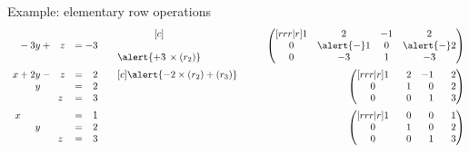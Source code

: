\documentclass%
[handout]%
{beamer}
\begin{document}
\begin{frame}[label=ERO-example]{Example: elementary row operations}
\begin{alignat*}{2}
\begin{matrix}
    \hphantom{2x} -            3y + \hphantom{-}z  & = -3   \end{matrix}
& \qquad
  \begin{matrix}[c]
     \\
     \\
   \alert{+3\,\times (r_2)}
  \end{matrix}
        \qquad & \begin{pmatrix}[rrr|r]
    1 &  2 & -1 &  2 \\
    0 &  \alert{-}1 &  0 & \alert{-}2 \\
    0 & -3 &  1 & -3
  \end{pmatrix}&
      \\[2pt]
  \begin{matrix}
    \hphantom{2}x +            2y - \hphantom{-}z  & = \hphantom{-}2 \\
    \hphantom{2x-2}y  \hphantom{--z}  & = \hphantom{-}2 \\
    \hphantom{2x+2y-} \hphantom{-}z  & = \hphantom{-}3   \end{matrix}
& \qquad
  \begin{matrix}[c]
     \alert{-2\times(r_2) + (r_3)}\\
    \\
    \null
  \end{matrix}
        \qquad &
  \begin{pmatrix}[rrr|r]
    1 & \hphantom{-}2 & -1 & \hphantom{-}2 \\
    0 & \hphantom{-}1 & \hphantom{-}0 & \hphantom{-}2 \\
    0 & \hphantom{-}0 & \hphantom{-}1 & \hphantom{-}3
  \end{pmatrix}&
       \\[2pt]
  \begin{matrix}
    \hphantom{2}x             \hphantom{+2y - -z}  & = \hphantom{-}1 \\
    \hphantom{2x-2}y  \hphantom{--z}  & = \hphantom{-}2 \\
    \hphantom{2x+2y-} \hphantom{-}z  & = \hphantom{-}3   \end{matrix}
& \quad
  \begin{matrix}
     \\
    \\
   \null
  \end{matrix}
        \qquad &
  \begin{pmatrix}[rrr|r]
    1 & \hphantom{-}0 & \hphantom{-}0 & \hphantom{-}1 \\
    0 & \hphantom{-}1 & \hphantom{-}0 & \hphantom{-}2 \\
    0 & \hphantom{-}0 & \hphantom{-}1 & \hphantom{-}3
  \end{pmatrix}&
\end{alignat*}
\end{frame}
\end{document}
